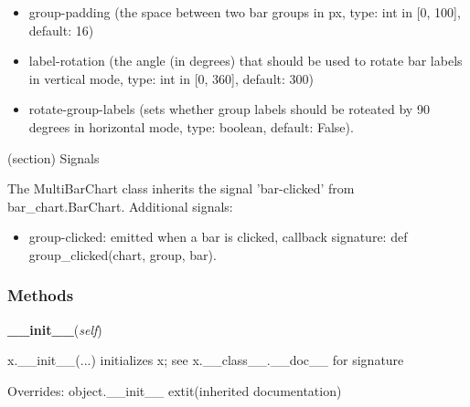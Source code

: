   \begin{itemize}
  \setlength{\parskip}{0.6ex}
    \item group-padding (the space between two bar groups in px, type: int in 
      [0, 100], default: 16)

    \item label-rotation (the angle (in degrees) that should be used to rotate 
      bar labels in vertical mode, type: int in [0, 360], default: 300)

    \item rotate-group-labels (sets whether group labels should be roteated by 
      90 degrees in horizontal mode, type: boolean, default: False).

  \end{itemize}

(section) Signals

  The MultiBarChart class inherits the signal 'bar-clicked' from 
  bar\_chart.BarChart. Additional signals:

  \begin{itemize}
  \setlength{\parskip}{0.6ex}
    \item group-clicked: emitted when a bar is clicked, callback signature: def
      group\_clicked(chart, group, bar).

  \end{itemize}



  \subsubsection{Methods}

    \vspace{0.5ex}

\hspace{.8\funcindent}\begin{boxedminipage}{\funcwidth}

    \raggedright \textbf{\_\_init\_\_}(\textit{self})

\setlength{\parskip}{2ex}
    x.\_\_init\_\_(...) initializes x; see x.\_\_class\_\_.\_\_doc\_\_ for 
    signature

\setlength{\parskip}{1ex}
      Overrides: object.\_\_init\_\_ 	extit{(inherited documentation)}

    \end{boxedminipage}

